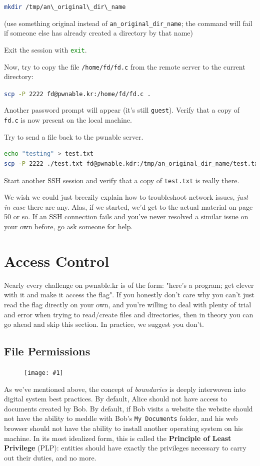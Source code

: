 \documentclass{article}
\newcommand{\wrapimageright}[1] {
    \begin{figure}
        \begin{center}
            \texttt{[image: \#1]} 
        \end{center}
    \end{figure}
}
\newcommand{\xcode}[2]{\colorbox{ubuntuback}{\lstinline[language=#1]|#2|}}
\newcommand{\code}[1]{\colorbox{ubuntuback}{\texttt{#1}}}
\begin{document}
\xcode{bash}{mkdir /tmp/an\_original\_dir\_name}

(use something original instead of \code{an\_original\_dir\_name}; the command will fail if someone else has already created a directory by that name)

Exit the session with \xcode{bash}{exit}.

Now, try to copy the file \code{/home/fd/fd.c} from the remote server to the current directory:

\xcode{bash}{scp -P 2222 fd@pwnable.kr:/home/fd/fd.c .}

Another password prompt will appear (it's still \code{guest}). Verify that a copy of \code{fd.c} is now present on the local machine.

Try to send a file back to the pwnable server. 
\begin{lstlisting}[language=bash]
echo "testing" > test.txt
scp -P 2222 ./test.txt fd@pwnable.kdr:/tmp/an_original_dir_name/test.txt
\end{lstlisting}

Start another SSH session and verify that a copy of \code{test.txt} is really there.

We wish we could just breezily explain how to troubleshoot network issues, \textit{just in case} there are any. Alas, if we started, we'd get to the actual material on page 50 or so. If an SSH connection fails and you've never resolved a similar issue on your own before, go ask someone for help. 

\section{Access Control}

Nearly every challenge on pwnable.kr is of the form: "here's a program; get clever with it and make it access the flag". If you honestly don't care why you can't just read the flag directly on your own, and you're willing to deal with plenty of trial and error when trying to read/create files and directories, then in theory you can go ahead and skip this section. In practice, we suggest you don't.

\subsection{File Permissions}

\wrapimageright{./images/file_permissions.png}
As we've mentioned above, the concept of \textit{boundaries} is deeply interwoven into digital system best practices. By default, Alice should not have access to documents created by Bob. By default, if Bob visits a website the website should not have the ability to meddle with Bob's \code{My Documents} folder, and his web browser should not have the ability to install another operating system on his machine. In its most idealized form, this is called the \textbf{Principle of Least Privilege} (PLP): entities should have exactly the privileges necessary to carry out their duties, and no more.
\end{document}
